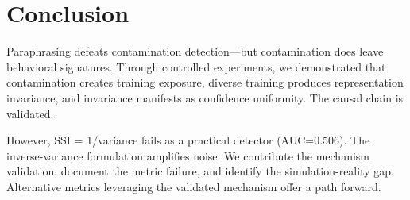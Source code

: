 \section{Conclusion}

Paraphrasing defeats contamination detection---but contamination does leave behavioral signatures. Through controlled experiments, we demonstrated that contamination creates training exposure, diverse training produces representation invariance, and invariance manifests as confidence uniformity. The causal chain is validated.

However, SSI = 1/variance fails as a practical detector (AUC=0.506). The inverse-variance formulation amplifies noise. We contribute the mechanism validation, document the metric failure, and identify the simulation-reality gap. Alternative metrics leveraging the validated mechanism offer a path forward.
